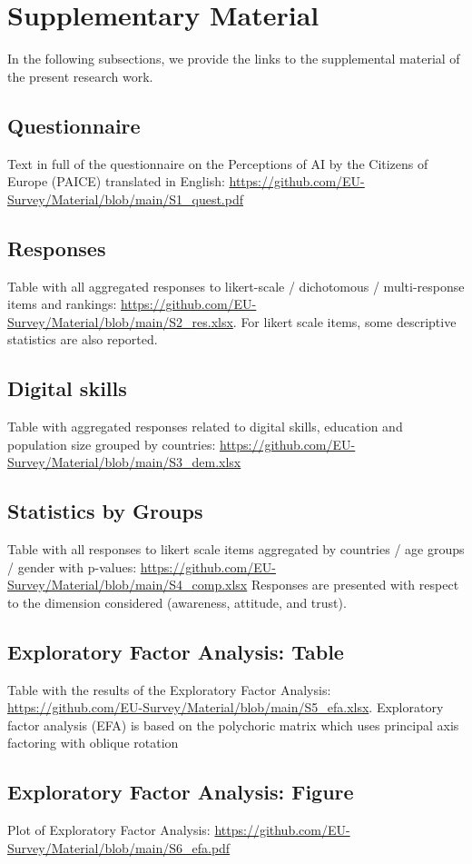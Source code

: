 \documentclass{article}
\begin{document}
\section{Supplementary Material}

In the following subsections, we provide the links to the supplemental material of the present research work. 

\subsection{Questionnaire}
\label{S1_Questionnaire}
Text in full of the questionnaire on the Perceptions of AI by the Citizens of Europe  (PAICE) translated in English: \url{https://github.com/EU-Survey/Material/blob/main/S1_quest.pdf} 

\subsection{Responses}
\label{S2_Tab_Resp}

Table with all aggregated responses to likert-scale / dichotomous / multi-response items and rankings: 
\url{https://github.com/EU-Survey/Material/blob/main/S2_res.xlsx}. 
For likert scale items, some descriptive statistics are also reported.  

\subsection{Digital skills}
\label{S3_Tab_Dem}

Table with aggregated responses related to digital skills, education and population size grouped by countries: \url{https://github.com/EU-Survey/Material/blob/main/S3_dem.xlsx}

\subsection{Statistics by Groups}
\label{S4_Tab_Comp}

Table with all responses to likert scale items aggregated by countries / age groups / gender with p-values: \url{https://github.com/EU-Survey/Material/blob/main/S4_comp.xlsx}
Responses are presented with respect to the dimension considered (awareness, attitude, and trust).

\subsection{Exploratory Factor Analysis: Table}
\label{S5_Tab_EFA}

Table with the results of the Exploratory Factor Analysis: \url{https://github.com/EU-Survey/Material/blob/main/S5_efa.xlsx}. Exploratory factor analysis (EFA) is based on the polychoric matrix which uses principal axis factoring with oblique rotation

\subsection{Exploratory Factor Analysis: Figure}
\label{S6_Fig_EFA}
Plot of Exploratory Factor Analysis: \url{https://github.com/EU-Survey/Material/blob/main/S6_efa.pdf}




\end{document}
